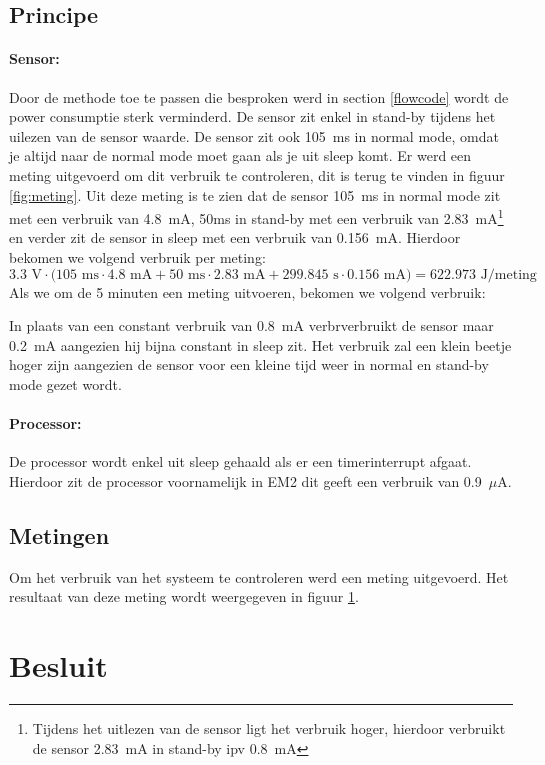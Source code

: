 \documentclass[]{article}
\begin{document}
\subsection{Principe}
\paragraph{Sensor: }
Door de methode toe te passen die besproken werd in section \ref{flowcode} wordt de power consumptie sterk verminderd. De sensor zit enkel in stand-by tijdens het uilezen van de sensor waarde. De sensor zit ook 105~ms in normal mode, omdat je altijd naar de normal mode moet gaan als je uit sleep komt. Er werd een meting uitgevoerd om dit verbruik te controleren, dit is terug te vinden in figuur \ref{fig:meting}. Uit deze meting is te zien dat de sensor 105~ms in normal mode zit met een verbruik van 4.8~mA, 50ms in stand-by met een verbruik van 2.83~mA\footnote{Tijdens het uitlezen van de sensor ligt het verbruik hoger, hierdoor verbruikt de sensor 2.83~mA in stand-by ipv 0.8~mA} en verder zit de sensor in sleep met een verbruik van 0.156~mA. Hierdoor bekomen we volgend verbruik per meting:
\begin{equation}
	 3.3\text{ V}\cdot\big(105\text{ ms} \cdot 4.8 \text{ mA} + 50\text{ ms}\cdot 2.83\text{ mA}+299.845\text{ s}\cdot 0.156\text{ mA}\big) = 622.973 \text{ J/meting}
\end{equation}
Als we om de 5 minuten een meting uitvoeren, bekomen we volgend verbruik:
\begin{equation}
\end{equation}




In plaats van een constant verbruik van 0.8~mA verbrverbruikt de sensor maar 0.2~mA aangezien hij bijna constant in sleep zit. Het verbruik zal een klein beetje hoger zijn aangezien de sensor voor een kleine tijd weer in normal en stand-by mode gezet wordt. 
\paragraph{Processor: }
De processor wordt enkel uit sleep gehaald als er een timerinterrupt afgaat. Hierdoor zit de processor voornamelijk in EM2 dit geeft een verbruik van 0.9~$\mu$A.
\subsection{Metingen}
Om het verbruik van het systeem te controleren werd een meting uitgevoerd. Het resultaat van deze meting wordt weergegeven in figuur \ref{}.







\section{Besluit }
\end{document}
